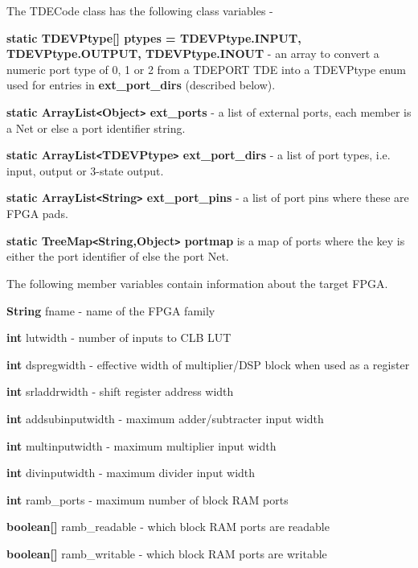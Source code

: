The TDECode class has the following class variables -

{\bf static TDEVPtype[] ptypes = {TDEVPtype.INPUT, TDEVPtype.OUTPUT, TDEVPtype.INOUT}} -
an array to convert a numeric port type of 0, 1 or 2 from a TDEPORT TDE
into a TDEVPtype enum used for entries in {\bf ext\_port\_dirs}
(described below).

{\bf static ArrayList\verb'<'Object\verb'>' ext\_ports} - a list of external
ports, each member is a Net or else a port identifier string.

{\bf static ArrayList\verb'<'TDEVPtype\verb'>' ext\_port\_dirs} - a list of
port types, i.e. input, output or 3-state output.

{\bf static ArrayList\verb'<'String\verb'>' ext\_port\_pins} - a list of port
pins where these are FPGA pads.

{\bf static TreeMap\verb'<'String,Object\verb'>' portmap} is a map of ports where
the key is either the port identifier of else the port Net.

The following member variables contain information about the target FPGA.

\blist
\item   {\bf String} fname - name of the FPGA family

\item   {\bf int} lutwidth - number of inputs to CLB LUT

\item   {\bf int} dspregwidth - effective width of multiplier/DSP
                                         block when used as a register

\item   {\bf int} srladdrwidth - shift register address width

\item   {\bf int} addsubinputwidth - maximum adder/subtracter input width

\item   {\bf int} multinputwidth - maximum multiplier input width

\item   {\bf int} divinputwidth - maximum divider input width

\item   {\bf int} ramb\_ports - maximum number of block RAM ports

\item   {\bf boolean[]} ramb\_readable - which block RAM ports are readable

\item   {\bf boolean[]} ramb\_writable - which block RAM ports are writable

